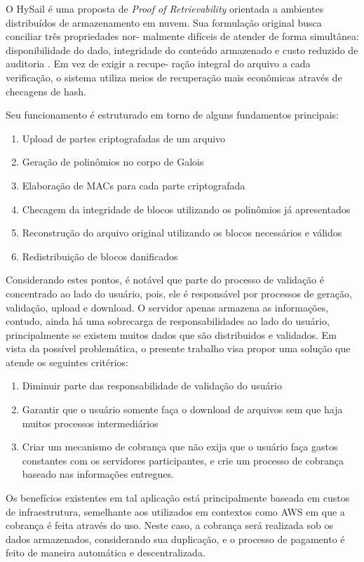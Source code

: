 O HySail é uma proposta de \emph{Proof of Retrievability} orientada a ambientes distribuídos de
armazenamento em nuvem. Sua formulação original busca conciliar três propriedades nor-
malmente difíceis de atender de forma simultânea: disponibilidade do dado, integridade
do conteúdo armazenado e custo reduzido de auditoria \cite{amaral2013hysail}. Em vez de exigir a recupe-
ração integral do arquivo a cada verificação, o sistema utiliza meios de recuperação
mais econômicas através de checagens de hash.

Seu funcionamento é estruturado em torno de alguns fundamentos principais:

\begin{enumerate}
\item Upload de partes criptografadas de um arquivo
\item Geração de polinômios no corpo de Galois
\item Elaboração de MACs para cada parte criptografada
\item Checagem da integridade de blocos utilizando os polinômios já apresentados
\item Reconstrução do arquivo original utilizando os blocos necessários e válidos
\item Redistribuição de blocos danificados
\end{enumerate}

Considerando estes pontos, é notável que parte do processo de validação é concentrado
ao lado do usuário, pois, ele é responsável por processos de geração, validação, upload e download.
O servidor apenas armazena as informações, contudo, ainda há uma sobrecarga de responsabilidades
ao lado do usuário, principalmente se existem muitos dados que são distribuidos e validados. Em
vista da possível problemática, o presente trabalho visa propor uma solução que atende os seguintes
critérios:

\begin{enumerate}
\item Diminuir parte das responsabilidade de validação do usuário
\item Garantir que o usuário somente faça o download de arquivos sem que haja muitos
processos intermediários
\item Criar um mecanismo de cobrança que não exija que o usuário faça gastos constantes
com os servidores participantes, e crie um processo de cobrança baseado nas informações
entregues.
\end{enumerate}

Os benefícios existentes em tal aplicação está principalmente baseada em custos de infraestrutura,
semelhante aos utilizados em contextos como AWS em que a cobrança é feita através do uso. Neste
caso, a cobrança será realizada sob os dados armazenados, considerando sua duplicação, e o
processo de pagamento é feito de maneira automática e descentralizada.

